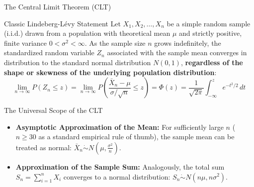 \documentclass[10pt, aspectratio=169]{beamer}
\begin{document}
\begin{frame}{The Central Limit Theorem (CLT)}
  \fontsize{7.5pt}{9pt}\selectfont
  \begin{block}{Classic Lindeberg-Lévy Statement}
    \fontsize{7.5pt}{9pt}\selectfont
    Let $X_1, X_2, \ldots, X_n$ be a simple random sample (i.i.d.) drawn from a population with theoretical mean $\mu$ and strictly positive, finite variance $0 < \sigma^2 < \infty$. As the sample size $n$ grows indefinitely, the standardized random variable $Z_n$ associated with the sample mean converges in distribution to the standard normal distribution $N(0,1)$, \textbf{regardless of the shape or skewness of the underlying population distribution}:
    $$\lim_{n \to \infty} P\left(Z_n \le z\right) = \lim_{n \to \infty} P\left(\frac{\bar{X}_n - \mu}{\sigma / \sqrt{n}} \le z\right) = \Phi(z) = \frac{1}{\sqrt{2\pi}} \int_{-\infty}^{z} e^{-t^2/2} \, dt$$
  \end{block}
  \vspace{-0.15cm}
  \pause
  \begin{alertblock}{The Universal Scope of the CLT}
    \fontsize{7.5pt}{9pt}\selectfont
    \begin{itemize}\itemsep=0.08cm
      \item \textbf{Asymptotic Approximation of the Mean:} For sufficiently large $n$ ($n \ge 30$ as a standard empirical rule of thumb), the sample mean can be treated as normal: $\bar{X}_n \dot{\sim} N\left(\mu, \frac{\sigma^2}{n}\right)$.
      \item \textbf{Approximation of the Sample Sum:} Analogously, the total sum $S_n = \sum_{i=1}^n X_i$ converges to a normal distribution: $S_n \dot{\sim} N(n\mu, n\sigma^2)$.
    \end{itemize}
  \end{alertblock}
\end{frame}
\end{document}
